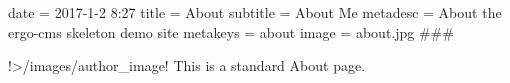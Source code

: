 date = 2017-1-2 8:27
title = About
subtitle = About Me
metadesc = About the ergo-cms skeleton demo site
metakeys = about
image = about.jpg
###

!>/images/{{author_image}}! This is a standard About page. 


